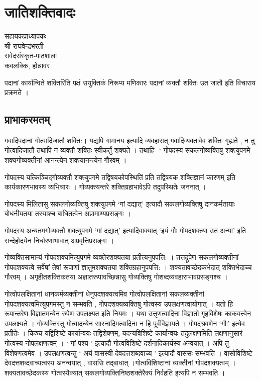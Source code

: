 \chapter{जातिशक्तिवादः}


\begin{center}
\smallskip

सहायकप्राध्यापकः\\
श्री राघवेन्द्रभरती-\\
सवेदसंस्कृत-पाठशाला\\
कवलक्कि, होन्नावर
\end{center}

पदानां कार्यान्विते शक्तिरिति पक्षं सयुक्तिकं निरूप्य मणिकारः पदानां व्यक्तौ शक्तिः उत जातौ इति विचाराय प्रक्रमते ।

\section*{प्राभाकरमतम्}

गवादिपदानां गोत्वादिजातौ शक्ति:। यद्यपि गामानय इत्यादि व्यवहारात् गवादिव्यक्तावेव शक्तिः गृह्यते , न तु गोत्वादिजातौ तथापि न व्यक्तौ शक्तिः स्वीकर्तुं शक्यते । तथाहि- ‘ गोपदस्य सकलगोव्यक्तिषु शक्त्युपगमे शक्यगोव्यक्तीनां आनन्त्येन शक्त्यानन्त्येन गौरवम् ।

गोपदस्य यत्किञ्चिद्गोव्यक्तौ शक्त्युपगमे तद्विषयकोपस्थितिं प्रति तद्विषयक शक्तिज्ञानं कारणम् इति कार्यकारणभावस्य व्यभिचारः । गोव्यक्त्यन्तरे शक्तिग्रहाभावेऽपि तदुपस्थितेः जननात् ।

गोपदस्य मिलितासु सकलगोव्यक्तिषु शक्त्युपगमे ‘गां दद्यात्’ इत्यादौ सकलगोव्यक्तिषु दानकर्मतायाः बोधनीयतया तस्याश्च बाधितत्वेन अप्रामाण्यप्रसङ्गः ।

गोपदस्य अन्यतमगोव्यक्तौ शक्त्युपगमे ‘गां दद्यात्’ इत्यादिवाक्यात् ‘इयं गौः गोपदशक्त्या उत अन्या’ इति सन्देहोदयेन निर्धारणाभावात् अप्रवृत्तिप्रसङ्गः ।

गोव्यक्तिसामान्यं गोपदशक्यमित्युपगमे व्यक्तेरशक्यतया प्रतीत्यनुपपत्ति: । तत्तद्रूपेण सकलगोव्यक्तीनां गोपदशक्यत्वे सर्वेषां तेषां रूपाणां ज्ञातुमशक्यतया शक्तिग्रहानुपपत्ति: । शक्यतावच्छेदकभेदात् शक्तिभेदाच्च गौरवम् । अगृहीतशक्तिकतया अज्ञातरूपावच्छिन्नासु गोव्यक्तिषु गोशब्दव्यवहाराभावप्रसङ्गश्च ।

गोत्वोपलक्षितानां धानकर्मव्यक्तीनां धेनुपदशक्यत्वमिव गोत्वोपलक्षितानां सकलव्यक्तीनां गोपदशक्यत्वमित्युपगमस्तु न सम्भवति , गोपदशक्यव्यक्तिषु गोत्वस्य उपलक्षणत्वायोगात् । यतो हि रूपान्तरेण विज्ञातमन्येन रुपेण उपलक्ष्यत इति नियमः । यथा उत्तृणत्वादिना विज्ञातो गृहविशेषः काकवत्त्वेन उपलक्ष्यते । गोव्यक्तिस्तु गोत्वादन्येन सास्नादिमत्वादिना न हि पूर्वंविज्ञायते । गोपदश्रवणेन ‘गौः’ इत्येव प्रतीतेः । किञ्च यद्विशिष्टे कार्यान्वयः तद्विशेषणम्, यदन्यविशिष्टे कार्यान्वयः तदुलक्षणमिति लक्षणानुसारं गोत्वस्य नोपलक्षणत्वम् । ‘ गां पश्य ’ इत्यादौ गोत्वविशिष्टे दर्शनादिकार्यस्य अन्वयात् । अपि तु विशेषणत्वमेव । उपलक्षणत्वन्तु ‘ अयं वासस्वी देवदत्तशब्दवाच्य ’ इत्यादौ वाससः सम्भवति । वासोविशिष्टे देवदत्तशब्दवाच्यत्वस्य अनन्वयात् , वाससि तद्बाधात् ।गोत्वविशिष्टानां व्यक्तीनां गोपदशक्यत्वम् । शक्यतावच्छेदकस्य गोत्वस्यैक्यात् सकलगोव्यक्तिनिष्ठशक्तेरैक्यं निर्वहति इत्यपि न सम्भवति ।

